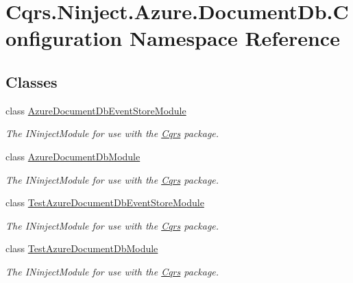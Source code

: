 \hypertarget{namespaceCqrs_1_1Ninject_1_1Azure_1_1DocumentDb_1_1Configuration}{}\section{Cqrs.\+Ninject.\+Azure.\+Document\+Db.\+Configuration Namespace Reference}
\label{namespaceCqrs_1_1Ninject_1_1Azure_1_1DocumentDb_1_1Configuration}
\subsection*{Classes}
\begin{DoxyCompactItemize}
\item 
class \hyperlink{classCqrs_1_1Ninject_1_1Azure_1_1DocumentDb_1_1Configuration_1_1AzureDocumentDbEventStoreModule}{Azure\+Document\+Db\+Event\+Store\+Module}
\begin{DoxyCompactList}\small\item\em The I\+Ninject\+Module for use with the \hyperlink{namespaceCqrs}{Cqrs} package. \end{DoxyCompactList}\item 
class \hyperlink{classCqrs_1_1Ninject_1_1Azure_1_1DocumentDb_1_1Configuration_1_1AzureDocumentDbModule}{Azure\+Document\+Db\+Module}
\begin{DoxyCompactList}\small\item\em The I\+Ninject\+Module for use with the \hyperlink{namespaceCqrs}{Cqrs} package. \end{DoxyCompactList}\item 
class \hyperlink{classCqrs_1_1Ninject_1_1Azure_1_1DocumentDb_1_1Configuration_1_1TestAzureDocumentDbEventStoreModule}{Test\+Azure\+Document\+Db\+Event\+Store\+Module}
\begin{DoxyCompactList}\small\item\em The I\+Ninject\+Module for use with the \hyperlink{namespaceCqrs}{Cqrs} package. \end{DoxyCompactList}\item 
class \hyperlink{classCqrs_1_1Ninject_1_1Azure_1_1DocumentDb_1_1Configuration_1_1TestAzureDocumentDbModule}{Test\+Azure\+Document\+Db\+Module}
\begin{DoxyCompactList}\small\item\em The I\+Ninject\+Module for use with the \hyperlink{namespaceCqrs}{Cqrs} package. \end{DoxyCompactList}\end{DoxyCompactItemize}
